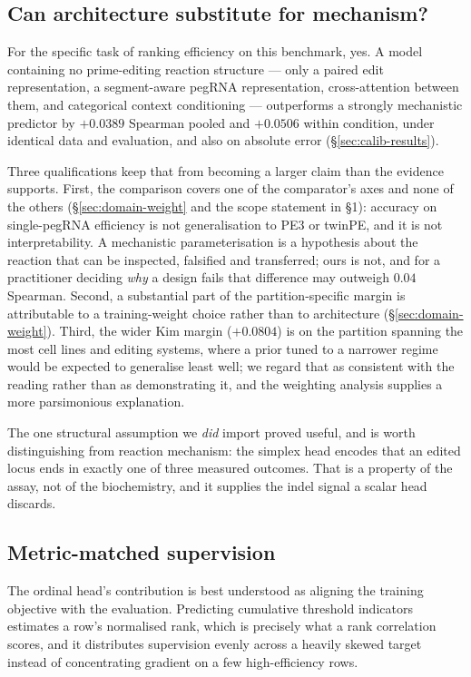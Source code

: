 \documentclass[11pt]{article}
\begin{document}
\subsection{Can architecture substitute for mechanism?}

For the specific task of ranking efficiency on this benchmark, yes. A model containing
no prime-editing reaction structure --- only a paired edit representation, a
segment-aware pegRNA representation, cross-attention between them, and categorical
context conditioning --- outperforms a strongly mechanistic predictor by $+0.0389$
Spearman pooled and $+0.0506$ within condition, under identical data and evaluation, and
also on absolute error (\S\ref{sec:calib-results}).

Three qualifications keep that from becoming a larger claim than the evidence supports.
First, the comparison covers one of the comparator's axes and none of the others
(\S\ref{sec:domain-weight} and the scope statement in \S1): accuracy on single-pegRNA
efficiency is not generalisation to PE3 or twinPE, and it is not interpretability. A
mechanistic parameterisation is a hypothesis about the reaction that can be inspected,
falsified and transferred; ours is not, and for a practitioner deciding \emph{why} a
design fails that difference may outweigh $0.04$ Spearman. Second, a substantial part
of the partition-specific margin is attributable to a training-weight choice rather
than to architecture (\S\ref{sec:domain-weight}). Third, the wider Kim margin
($+0.0804$) is on the partition spanning the most cell lines and editing systems, where
a prior tuned to a narrower regime would be expected to generalise least well; we
regard that as consistent with the reading rather than as demonstrating it, and the
weighting analysis supplies a more parsimonious explanation.

The one structural assumption we \emph{did} import proved useful, and is worth
distinguishing from reaction mechanism: the simplex head encodes that an edited locus
ends in exactly one of three measured outcomes. That is a property of the assay, not of
the biochemistry, and it supplies the indel signal a scalar head discards.

\subsection{Metric-matched supervision}

The ordinal head's contribution is best understood as aligning the training objective
with the evaluation. Predicting cumulative threshold indicators estimates a row's
normalised rank, which is precisely what a rank correlation scores, and it distributes
supervision evenly across a heavily skewed target instead of concentrating gradient on
a few high-efficiency rows.
\end{document}
